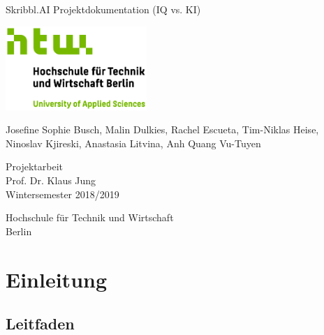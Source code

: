 \documentclass[11pt]{article}
\begin{document}
\begin{titlepage}
   \begin{center}
       \vspace*{1cm}

       \Huge
       Skribbl.AI Projektdokumentation (IQ vs. KI)
       \vspace{2.0cm}

       \includegraphics[width=0.4\textwidth]{logo.jpg}

       \vspace{1.5cm}
       \LARGE

       Josefine Sophie Busch, Malin Dulkies, Rachel Escueta, Tim-Niklas Heise, Ninoslav Kjireski, Anastasia Litvina, Anh Quang Vu-Tuyen

       \vfill

       Projektarbeit \\
       Prof. Dr. Klaus Jung\\
       Wintersemester 2018/2019\\

       \vspace{0.8cm}

       Hochschule für Technik und Wirtschaft\\
       Berlin\\

   \end{center}
\end{titlepage}

\pagebreak
\tableofcontents
\pagebreak
\listoftables
\listoffigures
\pagebreak

\section{Einleitung}
\subsection{Leitfaden}

 
\end{document}
